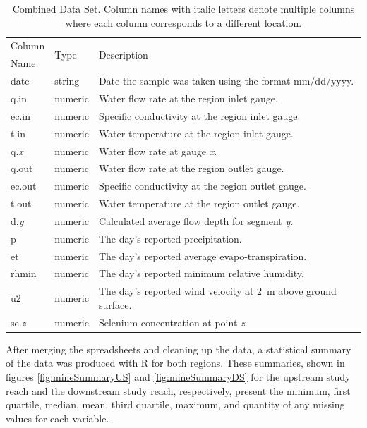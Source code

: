 \begin{table}[htbp]
	\centering
	\caption[Combined Data Set.]{Combined Data Set.  Column names with italic letters denote multiple columns where each column corresponds to a different location. }
	\label{tab:combinedData}
	\begin{tabular}{l  l  l}
		\toprule
		Column & \multirow{2}{*}{Type}  & \multirow{2}{*}{Description}\\
		Name
		\\ \toprule
		date & string & Date the sample was taken using the format mm/dd/yyyy. \\
		q.in & numeric & Water flow rate at the region inlet gauge. \\
		ec.in & numeric & Specific conductivity at the region inlet gauge. \\
		t.in & numeric & Water temperature at the region inlet gauge. \\
		q.\textit{x} & numeric & Water flow rate at gauge \textit{x}. \\
		q.out & numeric & Water flow rate at the region outlet gauge. \\
		ec.out & numeric & Specific conductivity at the region outlet gauge. \\
		t.out & numeric & Water temperature at the region outlet gauge. \\
		d.\textit{y} & numeric & Calculated average flow depth for segment \textit{y}. \\
		p & numeric & The day's reported precipitation. \\
		et & numeric & The day's reported average evapo-transpiration. \\
		rhmin & numeric & The day's reported minimum relative humidity. \\
		u2 & numeric & The day's reported wind velocity at \SI{2}{\meter} above ground surface. \\
		se.\textit{z} & numeric & Selenium concentration at point \textit{z}.
		\\ \bottomrule
	\end{tabular}
\end{table}

After merging the spreadsheets and cleaning up the data, a statistical summary of the data was produced with R for both regions.  These summaries, shown in figures \ref{fig:mineSummaryUS} and \ref{fig:mineSummaryDS} for the upstream study reach and the downstream study reach, respectively, present the minimum, first quartile, median, mean, third quartile, maximum, and quantity of any missing values for each variable.

